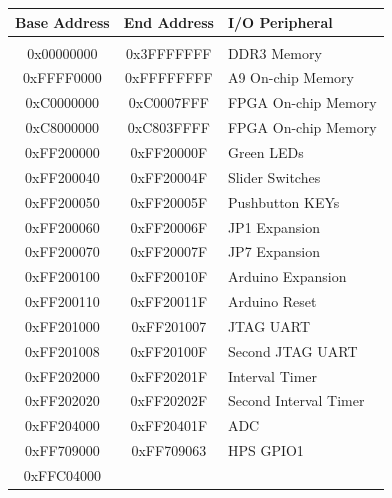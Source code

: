 \documentclass[11pt, twoside, pdftex]{article}
\begin{document}
\begin{table}[h]
    \begin{center}
    \begin{tabular}{c|c|l}
            \textbf{Base Address}
            & \textbf{End Address}
            & \textbf{I/O Peripheral}
				\\\hline\vspace{-3mm}\\
            0x00000000
            & 0x3FFFFFFF
            & DDR3 Memory
        \\
            0xFFFF0000
            & 0xFFFFFFFF
            & A9 On-chip Memory
        \\
						0xC0000000
				  	& 0xC0007FFF
						& FPGA On-chip Memory
				\\
            0xC8000000
            & 0xC803FFFF
            & FPGA On-chip Memory
        \\
            0xFF200000
            & 0xFF20000F
            & Green LEDs
        \\
            0xFF200040
            & 0xFF20004F
            & Slider Switches
        \\
            0xFF200050
            & 0xFF20005F
            & Pushbutton KEYs
        \\
            0xFF200060
            & 0xFF20006F
            & JP1 Expansion
        \\
            0xFF200070
            & 0xFF20007F
            & JP7 Expansion
        \\
            0xFF200100
            & 0xFF20010F
            & Arduino Expansion
        \\
            0xFF200110
            & 0xFF20011F
            & Arduino Reset
        \\
            0xFF201000
            & 0xFF201007
            & JTAG UART
        \\
            0xFF201008
            & 0xFF20100F
            & Second JTAG UART
        \\
            0xFF202000
            & 0xFF20201F
            & Interval Timer
        \\
            0xFF202020
            & 0xFF20202F
            & Second Interval Timer
        \\
            0xFF204000
            & 0xFF20401F
            & ADC
        \\
            0xFF709000
            & 0xFF709063
            & HPS GPIO1
        \\
            0xFFC04000

\end{tabular}
\end{center}
\end{table}
\end{document}
